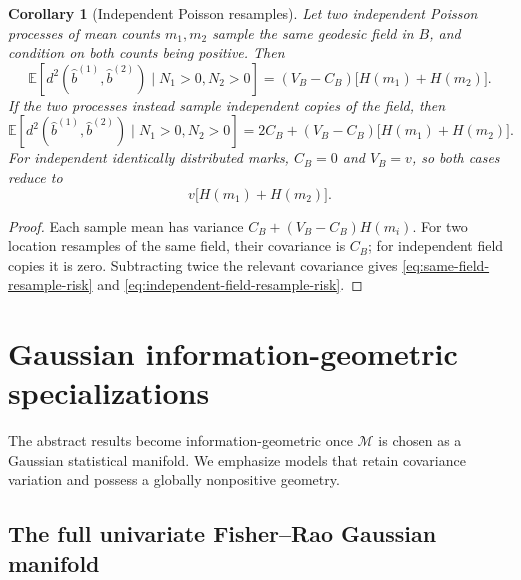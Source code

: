 \documentclass[11pt,a4paper]{article}
\newtheorem{corollary}[theorem]{Corollary}
\theoremstyle{remark}
\newcommand{\M}{\mathcal M}
\newcommand{\EE}{\mathbb E}
\begin{document}
\begin{corollary}[Independent Poisson resamples]
\label{cor:independent-resamples}
Let two independent Poisson processes of mean counts \(m_1,m_2\) sample the same geodesic field in \(B\), and condition on both counts being positive.  Then
\begin{equation}
\label{eq:same-field-resample-risk}
 \EE[d^2(\widehat b^{(1)},\widehat b^{(2)})\mid N_1>0,N_2>0]
 =(V_B-C_B)\bigl[H(m_1)+H(m_2)\bigr].
\end{equation}
If the two processes instead sample independent copies of the field, then
\begin{equation}
\label{eq:independent-field-resample-risk}
 \EE[d^2(\widehat b^{(1)},\widehat b^{(2)})\mid N_1>0,N_2>0]
 =2C_B+(V_B-C_B)\bigl[H(m_1)+H(m_2)\bigr].
\end{equation}
For independent identically distributed marks, \(C_B=0\) and \(V_B=v\), so both cases reduce to
\begin{equation}
\label{eq:independent-resample-risk}
 v\bigl[H(m_1)+H(m_2)\bigr].
\end{equation}
\end{corollary}

\begin{proof}
Each sample mean has variance \(C_B+(V_B-C_B)H(m_i)\).  For two location resamples of the same field, their covariance is \(C_B\); for independent field copies it is zero.  Subtracting twice the relevant covariance gives \eqref{eq:same-field-resample-risk} and \eqref{eq:independent-field-resample-risk}.
\end{proof}

\section{Gaussian information-geometric specializations}
\label{sec:gaussian}

The abstract results become information-geometric once \(\M\) is chosen as a Gaussian statistical manifold.  We emphasize models that retain covariance variation and possess a globally nonpositive geometry.

\subsection{The full univariate Fisher--Rao Gaussian manifold}
\label{subsec:univariate-fr}
\end{document}
